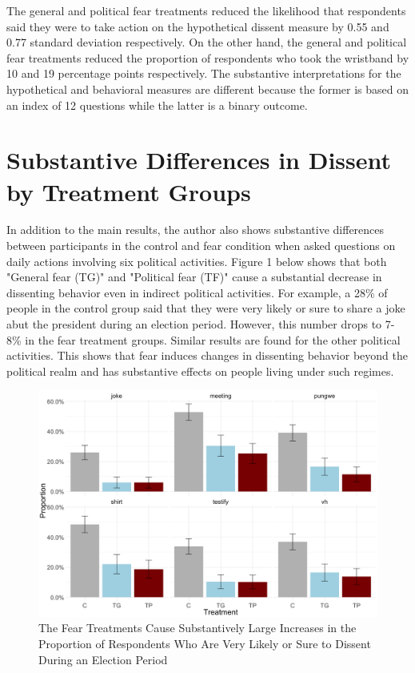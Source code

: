 \documentclass{article}
\begin{document}
The general and political fear treatments reduced the likelihood that respondents said they were to take action on the hypothetical dissent measure by 0.55 and 0.77 standard deviation respectively. On the other hand, the general and political fear treatments reduced the proportion of respondents who took the wristband by 10 and 19 percentage points respectively. The substantive interpretations for the hypothetical and behavioral measures are different because the former is based on an index of 12 questions while the latter is a binary outcome. 


\section{Substantive Differences in Dissent by Treatment Groups}

In addition to the main results, the author also shows substantive differences between participants in the control and fear condition when asked questions on daily actions involving six political activities. Figure 1 below shows that both "General fear (TG)" and "Political fear (TF)" cause a substantial decrease in dissenting behavior even in indirect political activities. For example, a 28\% of people in the control group said that they were very likely or sure to share a joke abut the president during an election period. However, this number drops to 7-8\% in the fear treatment groups. Similar results are found for the other political activities. This shows that fear induces changes in dissenting behavior beyond the political realm and has substantive effects on people living under such regimes. 

\begin{figure}[!htbp]
\includegraphics[scale=0.3]{Figure_2_Replicated.png}
\caption{The Fear Treatments Cause Substantively Large Increases in the Proportion of
Respondents Who Are Very Likely or Sure to Dissent During an Election Period}
\centering
\end{figure}
\newpage
\end{document}
